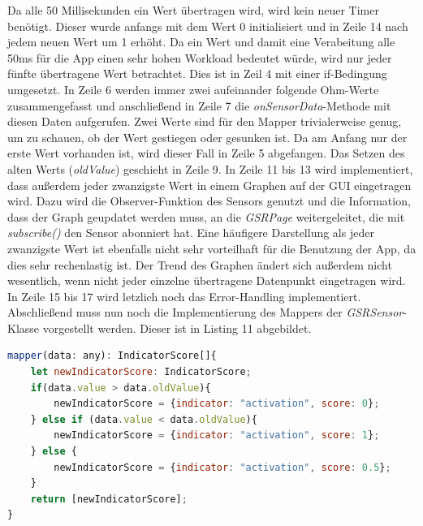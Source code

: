 Da alle 50 Millisekunden ein Wert übertragen wird, wird kein neuer Timer benötigt. Dieser wurde anfangs mit dem Wert 0 initialisiert und in Zeile 14 nach jedem neuen Wert um 1 erhöht. Da ein Wert und damit eine Verabeitung alle 50ms für die App einen sehr hohen Workload bedeutet würde, wird nur jeder fünfte übertragene Wert betrachtet. Dies ist in Zeil 4 mit einer if-Bedingung umgesetzt. In Zeile 6 werden immer zwei aufeinander folgende Ohm-Werte zusammengefasst und anschließend in Zeile 7 die \textit{onSensorData}-Methode mit diesen Daten aufgerufen. Zwei Werte sind für den Mapper trivialerweise genug, um zu schauen, ob der Wert gestiegen oder gesunken ist. Da am Anfang nur der erste Wert vorhanden ist, wird dieser Fall in Zeile 5 abgefangen. Das Setzen des alten Werts (\textit{oldValue}) geschieht in Zeile 9. \newline
In Zeile 11 bis 13 wird implementiert, dass außerdem jeder zwanzigste Wert in einem Graphen auf der GUI eingetragen wird. Dazu wird die Observer-Funktion des Sensors genutzt und die Information, dass der Graph geupdatet werden muss, an die \textit{GSRPage} weitergeleitet, die mit \textit{subscribe()} den Sensor abonniert hat. Eine häufigere Darstellung als jeder zwanzigste Wert ist ebenfalls nicht sehr vorteilhaft für die Benutzung der App, da dies sehr rechenlastig ist. Der Trend des Graphen ändert sich außerdem nicht wesentlich, wenn nicht jeder einzelne übertragene Datenpunkt eingetragen wird. In Zeile 15 bis 17 wird letzlich noch das Error-Handling implementiert. \newline
Abschließend muss nun noch die Implementierung des Mappers der \textit{GSRSensor}-Klasse vorgestellt werden. Dieser ist in Listing 11 abgebildet. \newline
\begin{lstlisting}[caption={Mapper des GSR-Sensors}, language=JavaScript]
mapper(data: any): IndicatorScore[]{
	let newIndicatorScore: IndicatorScore;
	if(data.value > data.oldValue){
		newIndicatorScore = {indicator: "activation", score: 0};
	} else if (data.value < data.oldValue){
		newIndicatorScore = {indicator: "activation", score: 1};
	} else { 
		newIndicatorScore = {indicator: "activation", score: 0.5};
	}
	return [newIndicatorScore];
}
\end{lstlisting}
